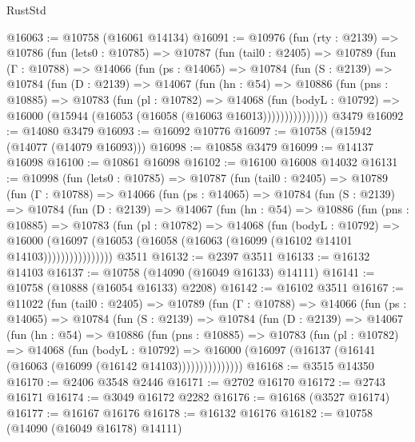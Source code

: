 \begin{lexlean}{RustStd}
\begin{coremodule}
@16063 := @10758 (@16061 @14134)
@16091 := @10976
    (fun (rty : @2139) =>
    @10786
      (fun (lets0 : @10785) =>
      @10787
        (fun (tail0 : @2405) =>
        @10789
          (fun (Γ : @10788) =>
          @14066
            (fun (ps : @14065) =>
            @10784
              (fun (S : @2139) =>
              @10784
                (fun (D : @2139) =>
                @14067
                  (fun (hn : @54) =>
                  @10886
                    (fun (pns : @10885) =>
                    @10783
                      (fun (pl : @10782) =>
                      @14068
                        (fun (bodyL : @10792) =>
                        @16000 (@15944 (@16053 (@16058 (@16063 @16013)))))))))))))))
    @3479
@16092 := @14080 @3479
@16093 := @16092 @10776
@16097 := @10758 (@15942 (@14077 (@14079 @16093)))
@16098 := @10858 @3479
@16099 := @14137 @16098
@16100 := @10861 @16098
@16102 := @16100 @16008 @14032
@16131 := @10998
    (fun (lets0 : @10785) =>
    @10787
      (fun (tail0 : @2405) =>
      @10789
        (fun (Γ : @10788) =>
        @14066
          (fun (ps : @14065) =>
          @10784
            (fun (S : @2139) =>
            @10784
              (fun (D : @2139) =>
              @14067
                (fun (hn : @54) =>
                @10886
                  (fun (pns : @10885) =>
                  @10783
                    (fun (pl : @10782) =>
                    @14068
                      (fun (bodyL : @10792) =>
                      @16000
                        (@16097
                          (@16053 (@16058 (@16063 (@16099 (@16102 @14101 @14103))))))))))))))))
    @3511
@16132 := @2397 @3511
@16133 := @16132 @14103
@16137 := @10758 (@14090 (@16049 @16133) @14111)
@16141 := @10758 (@10888 (@16054 @16133) @2208)
@16142 := @16102 @3511
@16167 := @11022
    (fun (tail0 : @2405) =>
    @10789
      (fun (Γ : @10788) =>
      @14066
        (fun (ps : @14065) =>
        @10784
          (fun (S : @2139) =>
          @10784
            (fun (D : @2139) =>
            @14067
              (fun (hn : @54) =>
              @10886
                (fun (pns : @10885) =>
                @10783
                  (fun (pl : @10782) =>
                  @14068
                    (fun (bodyL : @10792) =>
                    @16000 (@16097 (@16137 (@16141 (@16063 (@16099 (@16142 @14103)))))))))))))))
@16168 := @3515 @14350
@16170 := @2406 @3548 @2446
@16171 := @2702 @16170
@16172 := @2743 @16171
@16174 := @3049 @16172 @2282
@16176 := @16168 (@3527 @16174)
@16177 := @16167 @16176
@16178 := @16132 @16176
@16182 := @10758 (@14090 (@16049 @16178) @14111)

\end{coremodule}
\end{lexlean}
